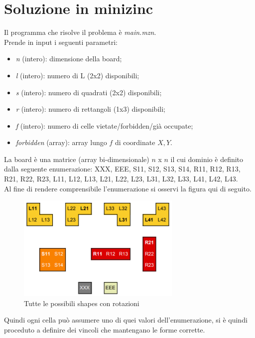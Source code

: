 \documentclass{article}
\begin{document}
\section{Soluzione in minizinc}
Il programma che risolve il problema è \textit{main.mzn}.\\
Prende in input i seguenti parametri:
\begin{itemize}
    \item \textit{n} (intero): dimensione della board;
    \item \textit{l} (intero): numero di L (2x2) disponibili;
    \item \textit{s} (intero): numero di quadrati (2x2) disponibili;
    \item \textit{r} (intero): numero di rettangoli (1x3) disponibili;
    \item \textit{f} (intero): numero di celle vietate/forbidden/già occupate;
    \item \textit{forbidden} (array): array lungo $f$ di coordinate $X,Y$.
\end{itemize}
La board è una matrice (array bi-dimensionale) $n$ x $n$ il cui dominio è definito dalla seguente enumerazione: XXX, EEE, S11, S12, S13, S14, R11, R12, R13, R21, R22, R23, L11, L12, L13, L21, L22, L23, L31, L32, L33, L41, L42, L43.\\
Al fine di rendere comprensibile l'enumerazione si osservi la figura qui di seguito.\\
\begin{figure}[h!]
    \centering
    \includegraphics[width=0.7\textwidth]{shapes}
    \caption{Tutte le possibili shapes con rotazioni}
\end{figure}
Quindi ogni cella può assumere uno di quei valori dell'enumerazione, si è quindi proceduto a definire dei vincoli che mantengano le forme corrette.
\end{document}
